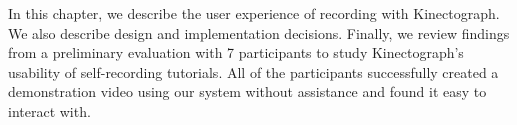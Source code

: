 In this chapter, we describe the user experience of recording with Kinectograph. We also describe design and implementation decisions. Finally, we review findings from a preliminary evaluation with 7 participants to study Kinectograph's usability of self-recording tutorials. All of the participants successfully created a demonstration video using our system without assistance and found it easy to interact with.


